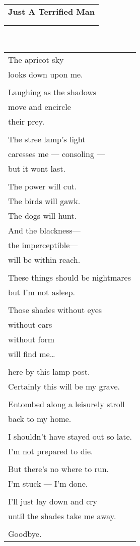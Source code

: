 \documentclass{article}
\begin{document}
\newcommand{\h}{\hspace*{2ex}}
\newcommand{\HHHH}{\hspace*{32ex}}

\begin{center}
\begin{tabular}{ll}
\multicolumn{2}{c}{\large\textbf{Just A Terrified Man}} \\
&\\\hline
&\\
\end{tabular} \\
\begin{tabular}{l}
The apricot sky \\
looks down upon me. \\
\\
Laughing as the shadows \\
move and encircle \\
their prey. \\
\\
The stree lamp's light \\
caresses me --- consoling --- \\
but it wont last. \\
\\
The power will cut. \\
The birds will gawk. \\
The dogs will hunt. \\
And the blackness--- \\
the imperceptible--- \\
will be within reach. \\
\\
These things should be nightmares \\
but I'm not asleep. \\
\\
Those shades without eyes \\
without ears \\
without form \\
will find me\ldots{} \\
\\
here by this lamp post. \\
Certainly this will be my grave. \\
\\
Entombed along a leisurely stroll \\
back to my home. \\
\\
I shouldn't have stayed out so late. \\
I'm not prepared to die. \\
\\
But there's no where to run. \\
I'm stuck --- I'm done. \\
\\
I'll just lay down and cry \\
until the shades take me away. \\
\\
Goodbye. \\
\end{tabular}
\end{center}
\end{document}
